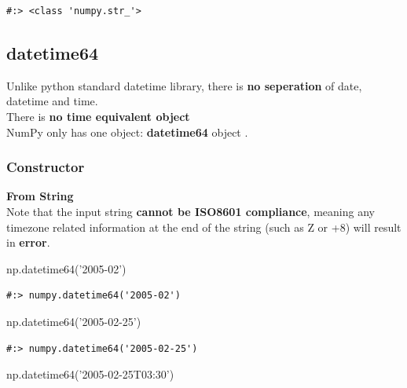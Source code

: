 \documentclass[
]{book}
\newenvironment{Shaded}{\begin{snugshade}}{\end{snugshade}}
\newcommand{\NormalTok}[1]{#1}
\newcommand{\StringTok}[1]{\textcolor[rgb]{0.5,0.5,0.5}{#1}}
\begin{document}
\begin{verbatim}
#:> <class 'numpy.str_'>
\end{verbatim}

\hypertarget{datetime64}{%
\subsection{datetime64}\label{datetime64}}

Unlike python standard datetime library, there is \textbf{no seperation} of date, datetime and time.\\
There is \textbf{no time equivalent object}\\
NumPy only has one object: \textbf{datetime64} object .

\hypertarget{constructor-6}{%
\subsubsection{Constructor}\label{constructor-6}}

\textbf{From String}\\
Note that the input string \textbf{cannot be ISO8601 compliance}, meaning any timezone related information at the end of the string (such as Z or +8) will result in \textbf{error}.

\begin{Shaded}
\begin{Highlighting}[]
\NormalTok{np.datetime64(}\StringTok{'2005-02'}\NormalTok{)}
\end{Highlighting}
\end{Shaded}

\begin{verbatim}
#:> numpy.datetime64('2005-02')
\end{verbatim}

\begin{Shaded}
\begin{Highlighting}[]
\NormalTok{np.datetime64(}\StringTok{'2005-02-25'}\NormalTok{)}
\end{Highlighting}
\end{Shaded}

\begin{verbatim}
#:> numpy.datetime64('2005-02-25')
\end{verbatim}

\begin{Shaded}
\begin{Highlighting}[]
\NormalTok{np.datetime64(}\StringTok{'2005-02-25T03:30'}\NormalTok{)}
\end{Highlighting}
\end{Shaded}
\end{document}
